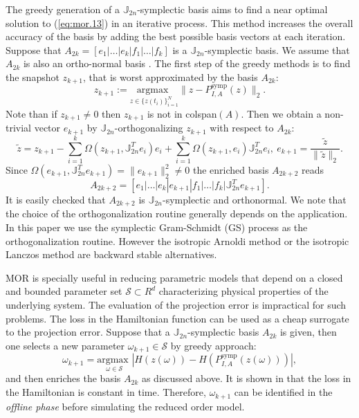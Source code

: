 The greedy generation of a $\mathbb J_{2n}$-symplectic basis aims to find a near optimal solution to (\ref{eq:mor.13}) in an iterative process. This method increases the overall accuracy of the basis by adding the best possible basis vectors at each iteration. Suppose that $A_{2k} = [e_1|\dots|e_k|f_1|\dots|f_k]$ is a $\mathbb J_{2n}$-symplectic basis. We assume that $A_{2k}$ is also an ortho-normal basis \cite{doi:10.1137/17M1111991}. The first step of the greedy methods is to find the snapshot $z_{k+1}$, that is worst approximated by the basis $A_{2k}$:
\begin{equation} \label{eq:mor.14}
	z_{k+1} := \underset{z \in \{ z(t_i) \}_{i=1}^N}{\text{argmax } }\| z - P^\text{symp}_{I,A}(z) \|_2. 
\end{equation}
Note than if $z_{k+1}\neq 0$ then $z_{k+1}$ is not in colspan$(A)$. Then we obtain a non-trivial vector $e_{k+1}$ by $\mathbb J_{2n}$-orthogonalizing $z_{k+1}$ with respect to $A_{2k}$:
$$\tilde{z} =z_{k+1} -\sum_{i=1}^k \Omega(z_{k+1},\mathbb J_{2n}^Te_i)e_i +\sum_{i=1}^k \Omega(z_{k+1},e_i)\mathbb J_{2n}^T e_i,~ e_{k+1} = \frac{\tilde{z}}{\|\tilde{z}\|_2}.$$
Since $\Omega(e_{k+1},\mathbb{J}_{2n}^T e_{k+1}) = \| e_{k+1} \|_2^2 \neq 0$ the enriched basis $A_{2k+2}$ reads
\begin{equation} \label{eq:mor.15}
	A_{2k+2} = [e_1|\dots|e_k|e_{k+1}|f_1|\dots|f_k|\mathbb{J}_{2n}^T e_{k+1}].	
\end{equation}
It is easily checked that $A_{2k+2}$ is $\mathbb J_{2n}$-symplectic and orthonormal. We note that the choice of the orthogonalization routine generally depends on the application. In this paper we use the symplectic Gram-Schmidt (GS) process as the orthogonalization routine. However the isotropic Arnoldi method or the isotropic Lanczos method \cite{doi:10.1137/S1064827500366434} are backward stable alternatives.

MOR is specially useful in reducing parametric models that depend on a closed and bounded parameter set $\mathcal{S} \subset R^{d}$ characterizing physical properties of the underlying system. The evaluation of the projection error is impractical for such problems. The loss in the Hamiltonian function can be used as a cheap surrogate to the projection error. Suppose that a $\mathbb J_{2n}$-symplectic basis $A_{2k}$ is given, then one selects a new parameter $\omega_{k+1} \in \mathcal{S}$ by greedy approach:
\begin{equation} \label{eq:mor.16}
	\omega_{k+1} = \underset{\omega \in \mathcal{S}}{\text{argmax } } | H(z(\omega)) - H(P^\text{symp}_{I,A}(z(\omega))) |,
\end{equation}
and then enriches the basis $A_{2k}$ as discussed above. It is shown in \cite{doi:10.1137/17M1111991} that the loss in the Hamiltonian is constant in time. Therefore, $\omega_{k+1}$ can be identified in the \emph{offline phase} before simulating the reduced order model.

